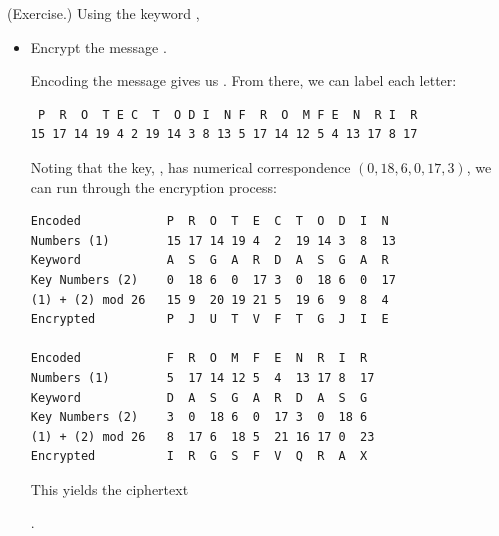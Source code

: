 \documentclass[letterpaper]{article}
\newcommand{\0}{\mathbf{0}}
\begin{document}
\begin{mdframed}
    (Exercise.) Using the keyword , 
    \begin{itemize}
        \item Encrypt the message .
        \begin{mdframed}
            Encoding the message gives us . From there, we can label each letter:
            \begin{mdframed}
                \begin{verbatim}
 P  R  O  T E C  T  O D I  N F  R  O  M F E  N  R I  R
15 17 14 19 4 2 19 14 3 8 13 5 17 14 12 5 4 13 17 8 17\end{verbatim}
            \end{mdframed}
            Noting that the key, , has numerical correspondence $(0, 18, 6, 0, 17, 3)$, we can run through the encryption process: 
            \begin{mdframed}
\begin{verbatim}
Encoded            P  R  O  T  E  C  T  O  D  I  N
Numbers (1)        15 17 14 19 4  2  19 14 3  8  13 
Keyword            A  S  G  A  R  D  A  S  G  A  R
Key Numbers (2)    0  18 6  0  17 3  0  18 6  0  17
(1) + (2) mod 26   15 9  20 19 21 5  19 6  9  8  4
Encrypted          P  J  U  T  V  F  T  G  J  I  E

Encoded            F  R  O  M  F  E  N  R  I  R
Numbers (1)        5  17 14 12 5  4  13 17 8  17
Keyword            D  A  S  G  A  R  D  A  S  G
Key Numbers (2)    3  0  18 6  0  17 3  0  18 6
(1) + (2) mod 26   8  17 6  18 5  21 16 17 0  23
Encrypted          I  R  G  S  F  V  Q  R  A  X\end{verbatim}
            \end{mdframed}
            This yields the ciphertext 
            \begin{mdframed}
                .
            \end{mdframed}
        \end{mdframed}


\end{itemize}
\end{mdframed}
\end{document}

